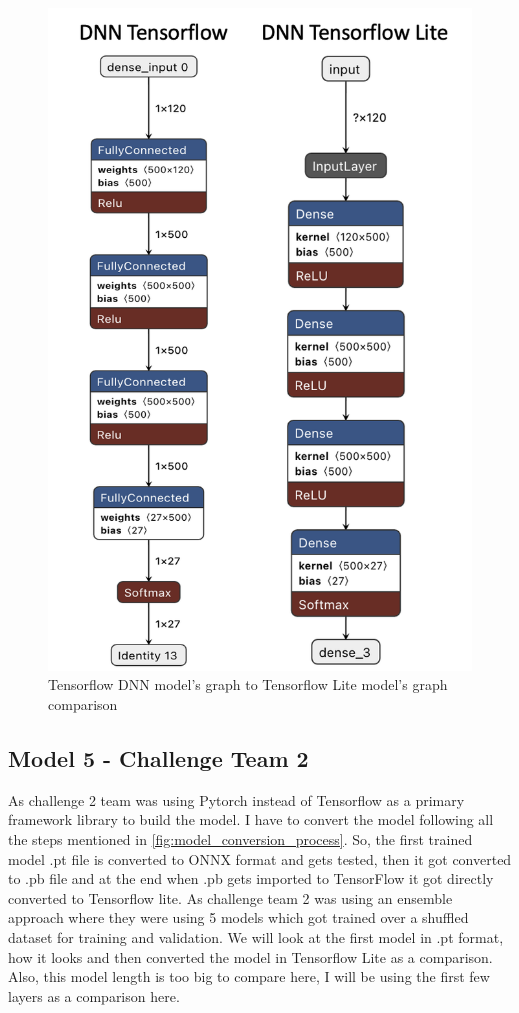 \begin{figure}[H]
\centering
\includegraphics[scale=0.7]{img/dnn_conversion_comparison.png}
\caption{Tensorflow DNN model's graph to Tensorflow Lite model's graph comparison}
\label{dnn_conversion_comparison}
\end{figure}


\subsection{Model 5 - Challenge Team 2}\label{5CTLM5}

As challenge 2 team was using Pytorch instead of Tensorflow as a primary framework library to build the model. I have to convert the model following all the steps mentioned in \ref{fig:model_conversion_process}. So, the first trained model .pt file is converted to ONNX format and gets tested, then it got converted to .pb file and at the end when .pb gets imported to TensorFlow it got directly converted to Tensorflow lite. As challenge team 2 was using an ensemble approach where they were using 5 models which got trained over a shuffled dataset for training and validation. We will look at the first model in .pt format, how it looks and then converted the model in Tensorflow Lite as a comparison. Also, this model length is too big to compare here, I will be using the first few layers as a comparison here. 

